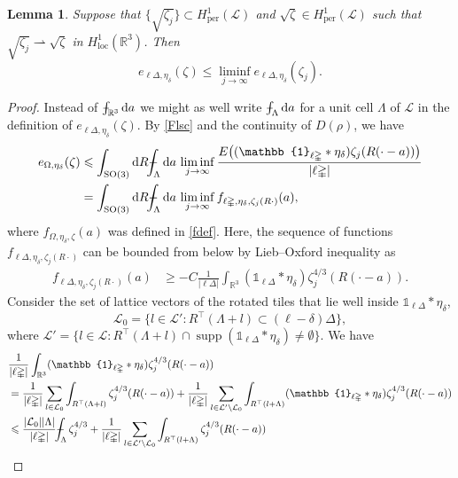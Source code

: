 \documentclass[final,onefignum,onetabnum,reqno]{amsart}
\newtheorem{lemma}[theorem]{Lemma}
\theoremstyle{remark}
\renewcommand{\le}{\leqslant}
\renewcommand{\ge}{\geqslant}
\DeclareMathOperator{\supp}{supp}
\newcommand{\RR}{\mathbb{R}}
\newcommand{\SO}{\mathrm{SO}}
\newcommand{\per}{\mathrm{per}} %
\newcommand{\wconv}{\rightharpoonup} %
\newcommand{\iden}{\mathbb{1}} %
\newcommand{\tetra}{\mathbb{\Delta}} %
\newcommand{\dd}{\mathrm{d}} %
\newcommand{\Hloc}{H_{\mathrm{loc}}} %
\def\Xint#1{\mathchoice
{\XXint\displaystyle\textstyle{#1}}%
{\XXint\textstyle\scriptstyle{#1}}%
{\XXint\scriptstyle\scriptscriptstyle{#1}}%
{\XXint\scriptscriptstyle\scriptscriptstyle{#1}}%
\!\int}
\def\XXint#1#2#3{{\setbox0=\hbox{$#1{#2#3}{\int}$ }
\vcenter{\hbox{$#2#3$ }}\kern-.6\wd0}}
\def\dashint{\Xint-}
\newcommand{\LC}{\mathcal{L}}
\begin{document}
\begin{lemma}\label{evollsc}
Suppose that $\{\sqrt{\zeta_j}\}\subset H^1_\per(\LC)$ and $\sqrt{\zeta}\in H^1_\per(\LC)$ such that 
$\sqrt{\zeta_j}\wconv\sqrt{\zeta}$ in $\Hloc^1(\RR^3)$. Then
$$
e_{\ell\tetra,\eta_\delta}(\zeta)\le \liminf_{j\to\infty} e_{\ell\tetra,\eta_\delta}(\zeta_j).
$$
\end{lemma}
\begin{proof}
Instead of $\dashint_{\RR^3}\dd a$ we might as well write $\dashint_\Lambda\dd a$ for a unit cell $\Lambda$ of $\LC$ in the definition of $e_{\ell\tetra,\eta_\delta}(\zeta)$. By \cref{Flsc} and the continuity
of $D(\rho)$, we have
\begin{equation}\label{evolscpr}
\begin{aligned}
e_{\Omega,\eta_\delta}(\zeta)
&\le \int_{\SO(3)}\dd  R \dashint_{\Lambda}\dd a\, \liminf_{j\to\infty} \frac{E\bigl((\iden_{\ell\tetra}*\eta_\delta)\zeta_j(R(\cdot-a))\bigr)}{|\ell\tetra|}\\
&=\int_{\SO(3)}\dd  R \dashint_{\Lambda}\dd a\, \liminf_{j\to\infty} f_{\ell\tetra,\eta_\delta,\zeta_j(R\cdot)}(a),
\end{aligned}
\end{equation}
where $f_{\Omega,\eta_\delta,\zeta}(a)$ was defined in \cref{fdef}.
Here, the sequence of functions $f_{\ell\tetra,\eta_\delta,\zeta_j(R\cdot)}$ can be bounded from below by Lieb--Oxford inequality as
\begin{align*}
f_{\ell\tetra,\eta_\delta,\zeta_j(R\cdot)}(a)&\ge - C\frac{1}{|\ell\tetra|}\int_{\RR^3} (\iden_{\ell\tetra}*\eta_\delta)\zeta_j^{4/3}(R(\cdot-a)).
\end{align*}
Consider the set of lattice vectors of the rotated tiles that lie well inside $\iden_{\ell\tetra}*\eta_\delta$,
$$
\LC_0=\{ l\in\LC' : R^\top(\Lambda+l)\subset (\ell-\delta)\tetra \},
$$
where
$\LC'=\{ l\in\LC : R^\top(\Lambda+l)\cap \supp(\iden_{\ell\tetra}*\eta_\delta)\neq\emptyset \}$.
We have
\begin{align*}
&\frac{1}{|\ell\tetra|}\int_{\RR^3} (\iden_{\ell\tetra}*\eta_\delta)\zeta_j^{4/3}(R(\cdot-a))\\
&=\frac{1}{|\ell\tetra|}\sum_{l\in\LC_0}\int_{R^\top(\Lambda+l)}\zeta_j^{4/3}(R(\cdot-a))
+\frac{1}{|\ell\tetra|}\sum_{l\in\LC'\setminus\LC_0} \int_{R^\top(l+\Lambda)} (\iden_{\ell\tetra}*\eta_\delta)\zeta_j^{4/3}(R(\cdot-a))\\
&\le \frac{|\LC_0||\Lambda|}{|\ell\tetra|}\dashint_{\Lambda}\zeta_j^{4/3}
+\frac{1}{|\ell\tetra|}\sum_{l\in\LC'\setminus\LC_0} \int_{R^\top(l+\Lambda)}\zeta_j^{4/3}(R(\cdot-a))\\

\end{align*}
\end{proof}
\end{document}
